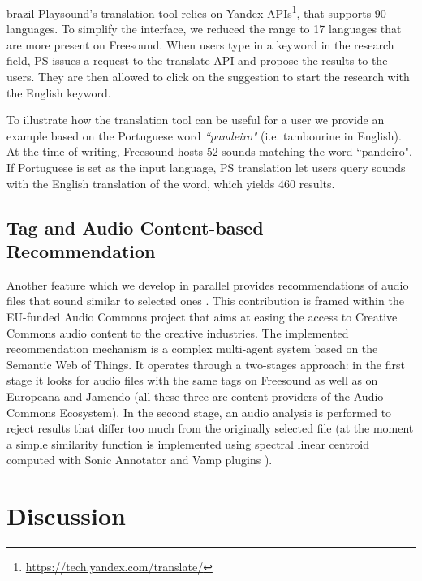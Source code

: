 \begin{otherlanguage*}{brazil}
Playsound's translation tool relies on Yandex APIs\footnote{\url{https://tech.yandex.com/translate/}}, that supports 90 languages. To simplify the interface, we reduced the range to 17 languages that are more present on Freesound. When users type in a keyword in the research field, PS issues a request to the translate API and propose the results to the users. They are then allowed to click on the suggestion to start the research with the English keyword.

To illustrate how the translation tool can be useful for a user we provide an example based on the Portuguese word \textit{``pandeiro"} (i.e. tambourine in English). At the time of writing, Freesound hosts 52 sounds matching the word ``pandeiro". If Portuguese is set as the input language, PS translation let users query sounds with the English translation of the word, which yields 460 results.

\subsection{Tag and Audio Content-based Recommendation}

Another feature which we develop in parallel provides recommendations of audio files that sound similar to selected ones \cite{Viola2018}. This contribution is framed within the EU-funded Audio Commons project that aims at easing the access to Creative Commons audio content to the creative industries. The implemented recommendation mechanism is a complex multi-agent system based on the Semantic Web of Things. It operates through a two-stages approach: in the first stage it looks for audio files with the same tags on Freesound as well as on Europeana and Jamendo (all these three are content providers of the Audio Commons Ecosystem). In the second stage, an audio analysis is performed to reject results that differ too much from the originally selected file (at the moment a simple similarity function is implemented using spectral linear centroid computed with Sonic Annotator and Vamp plugins \cite{Cannam2010}).

\section{Discussion}


\end{otherlanguage*}
